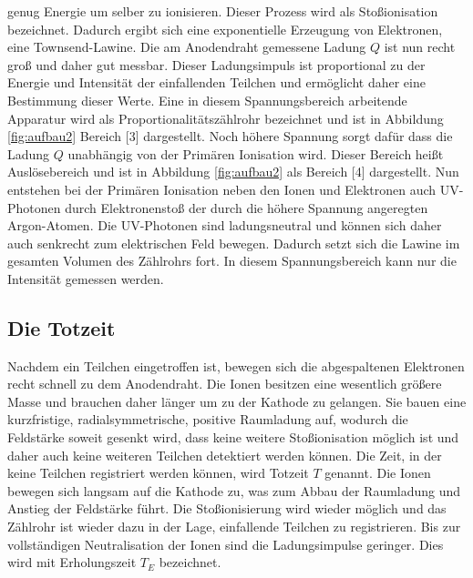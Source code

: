     genug Energie um selber zu ionisieren. Dieser Prozess wird als Stoßionisation bezeichnet. Dadurch
    ergibt sich eine exponentielle Erzeugung von Elektronen, eine Townsend-Lawine. Die am Anodendraht
    gemessene Ladung $Q$ ist nun recht groß und daher gut messbar. Dieser Ladungsimpuls ist
    proportional zu der Energie und Intensität der einfallenden Teilchen und ermöglicht daher eine
    Bestimmung dieser Werte. Eine in diesem Spannungsbereich arbeitende Apparatur wird als
    Proportionalitätszählrohr bezeichnet und ist in Abbildung \ref{fig:aufbau2} Bereich [3]
    dargestellt.
    Noch höhere Spannung sorgt dafür dass die Ladung $Q$ unabhängig von der Primären Ionisation wird.
    Dieser Bereich heißt Auslösebereich und ist in Abbildung \ref{fig:aufbau2} als Bereich [4]
    dargestellt. Nun entstehen bei der Primären Ionisation neben den Ionen und Elektronen auch
    UV-Photonen durch Elektronenstoß der durch die höhere Spannung angeregten Argon-Atomen. Die
    UV-Photonen sind ladungsneutral und können sich daher auch senkrecht zum elektrischen Feld bewegen.
    Dadurch setzt sich die Lawine im gesamten Volumen des Zählrohrs fort. In diesem Spannungsbereich
    kann nur die Intensität gemessen werden.
  \subsection{Die Totzeit}
    Nachdem ein Teilchen eingetroffen ist, bewegen sich die abgespaltenen Elektronen recht schnell zu
    dem Anodendraht. Die Ionen besitzen eine wesentlich größere Masse und brauchen daher länger um zu
    der Kathode zu gelangen. Sie bauen eine kurzfristige, radialsymmetrische, positive Raumladung auf,
    wodurch die Feldstärke soweit gesenkt wird, dass keine weitere Stoßionisation möglich ist und
    daher auch keine weiteren Teilchen detektiert werden können. Die Zeit, in der keine Teilchen
    registriert werden können, wird Totzeit $T$ genannt. Die Ionen bewegen sich langsam auf die
    Kathode zu, was zum Abbau der Raumladung und Anstieg der Feldstärke führt. Die Stoßionisierung
    wird wieder möglich und das Zählrohr ist wieder dazu in der Lage, einfallende Teilchen zu
    registrieren. Bis zur vollständigen Neutralisation der Ionen sind die Ladungsimpulse geringer.
    Dies wird mit Erholungszeit $T_{E}$ bezeichnet.
